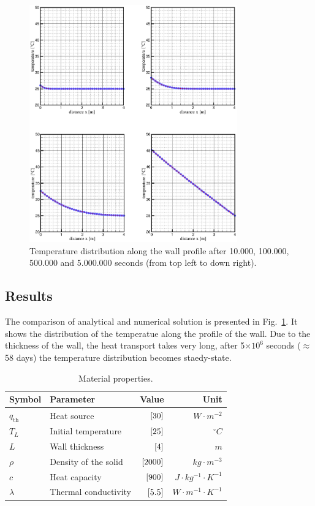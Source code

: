 \begin{figure}[!htbp]
\centering
\includegraphics[width=0.8\textwidth]{PART_II/T/lhdw-all.eps}
\caption{Temperature distribution along the wall profile after 10.000, 100.000, 500.000 and 5.000.000 seconds (from top left to down right).}
\label{fig-lhdw-all}
\end{figure}

\subsection{Results}

The comparison of analytical and numerical solution is presented in Fig.~\ref{fig-lhdw-all}. It shows the distribution of the temperatue along the profile of the wall. Due to the thickness of the wall, the heat transport takes very long, after 5$\times 10^6$ seconds ($\approx$ 58 days) the temperature distribution becomes staedy-state.
%

\begin{table}[!htbp]
\caption{\label{tab-ldhwp}Material properties.}
\begin{center}
\begin{tabular}{llrr}
\toprule
Symbol & Parameter & Value & Unit \\
\midrule
$q_{\mathrm{th}}$ & Heat source & $\, \mathrm{[}30]{}$   &  ${W \cdot m^{-2}}$ \\			
$T_L$ & Initial temperature	  & $\, \mathrm{[}25]{}$   & ${^{\circ}C}$ \\
$L$   & Wall thickness          & $\, \mathrm{[}4]{}$    & ${m}$ \\
$\rho$& Density of the solid	  & $\, \mathrm{[}2000]{}$ & ${kg \cdot m^{-3}}$ \\			
$c$   & Heat capacity           & $\, \mathrm{[}900]{}$  & ${J \cdot kg^{-1} \cdot K^{-1}}$ \\
$\lambda$& Thermal conductivity & $\, \mathrm{[}5.5]{}$  & ${W \cdot m^{-1} \cdot K^{-1}}$ \\
\bottomrule
\end{tabular}
\end{center}
\end{table}

